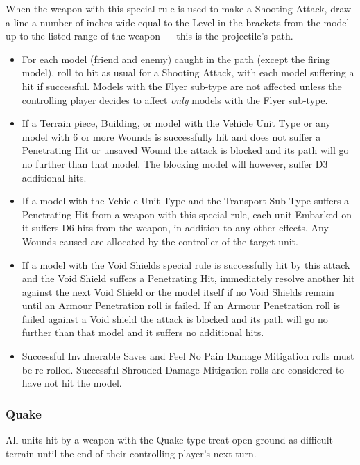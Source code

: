 \begin{multicols}{2}
When the weapon with this special rule is used to make a Shooting Attack, draw a line a number of inches wide equal to the Level in the brackets from the model up to the listed range of the weapon — this is the projectile's path.

\begin{itemize}
	\item For each model (friend and enemy) caught in the path (except the firing model), roll to hit as usual for a Shooting Attack, with each model suffering a hit if successful. Models with the Flyer sub-type are not affected unless the controlling player decides to affect \textit{only} models with the Flyer sub-type.
	\item If a Terrain piece, Building, or model with the Vehicle Unit Type or any model with 6 or more Wounds is successfully hit and does not suffer a Penetrating Hit or unsaved Wound the attack is blocked and its path will go no further than that model. The blocking model will however, suffer D3 additional hits.
	\item If a model with the Vehicle Unit Type and the Transport Sub-Type suffers a Penetrating Hit from a weapon with this special rule, each unit Embarked on it suffers D6 hits from the weapon, in addition to any other effects. Any Wounds caused are allocated by the controller of the target unit.
	\item If a model with the Void Shields special rule is successfully hit by this attack and the Void Shield suffers a Penetrating Hit, immediately resolve another hit against the next Void Shield or the model itself if no Void Shields remain until an Armour Penetration roll is failed. If an Armour Penetration roll is failed against a Void shield the attack is blocked and its path will go no further than that model and it suffers no additional hits.
	\item Successful Invulnerable Saves and Feel No Pain Damage Mitigation rolls must be re-rolled. Successful Shrouded Damage Mitigation rolls are considered to have not hit the model.
\end{itemize}

\subsubsection{Quake} \label{Quake}

All units hit by a weapon with the Quake type treat open ground as difficult terrain until the end of their controlling player's next turn.


\end{multicols}
